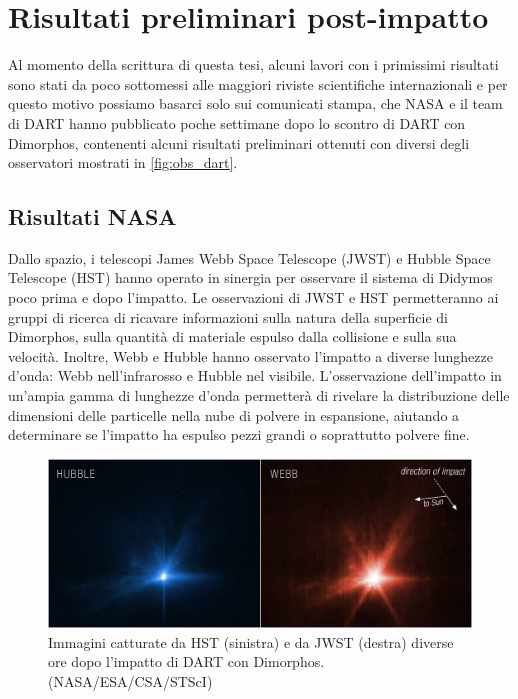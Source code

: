 \documentclass[a4paper,11pt,openright]{book}
\begin{document}
\chapter{Risultati preliminari post-impatto}\label{ch:ch_5}
Al momento della scrittura di questa tesi, alcuni lavori con i primissimi risultati sono stati da poco sottomessi alle maggiori riviste scientifiche internazionali e per questo motivo possiamo basarci solo sui comunicati stampa, che NASA e il team di DART hanno pubblicato poche settimane dopo lo scontro di DART con Dimorphos, contenenti alcuni risultati preliminari ottenuti con diversi degli osservatori mostrati in \cref{fig:obs_dart}. 

\section{Risultati NASA}
Dallo spazio, i telescopi James Webb Space Telescope (JWST) e Hubble Space Telescope (HST) hanno operato in sinergia per osservare il sistema di Didymos poco prima e dopo l'impatto. Le osservazioni di JWST e HST permetteranno ai gruppi di ricerca di ricavare informazioni sulla natura della superficie di Dimorphos, sulla quantità di materiale espulso dalla collisione e sulla sua velocità. Inoltre, Webb e Hubble hanno osservato l'impatto a diverse lunghezze d'onda: Webb nell'infrarosso e Hubble nel visibile. L'osservazione dell'impatto in un'ampia gamma di lunghezze d'onda permetterà di rivelare la distribuzione delle dimensioni delle particelle nella nube di polvere in espansione, aiutando a determinare se l'impatto ha espulso pezzi grandi o soprattutto polvere fine. 

\begin{figure}[!h]
    \centering
    \includegraphics[width=\textwidth]{figure/jwst_hst_impact.png}
    \caption[Immagini catturate da Hubble e da Webb diverse ore dopo l'impatto di DART con Dimorphos.]{Immagini catturate da HST (sinistra) e da JWST (destra) diverse ore dopo l'impatto di DART con Dimorphos. (NASA/ESA/CSA/STScI)}
    \label{fig:jwst_hst_impact}
\end{figure}
\end{document}
